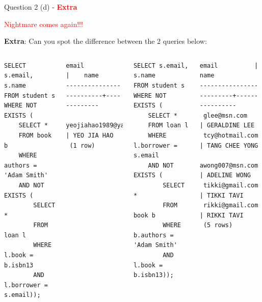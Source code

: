 \begin{frame}[fragile]{Question 2 (d) - \textcolor{red}{\textbf{Extra}}}

\begin{center}
	\textcolor{red}{Nightmare comes again!!!}
\end{center}

\textbf{Extra}: Can you spot the difference between the 2 queries below:
\begin{columns}[t]
\begin{lstlisting}[style=sql-small]
SELECT s.email, s.name
FROM student s
WHERE NOT EXISTS (
	SELECT * 
	FROM book b
	WHERE authors = 'Adam Smith' 
	AND NOT EXISTS (
		SELECT * 
		FROM loan l
		WHERE l.book = b.isbn13 
		AND l.borrower = s.email));
\end{lstlisting}
\begin{lstlisting}[style=terminal-tiny]	
          email          |    name
-------------------------+-------------
 yeojiahao1989@yahoo.com | YEO JIA HAO
 (1 row)	
\end{lstlisting}

\begin{lstlisting}[style=sql-small]
SELECT s.email, s.name
FROM student s
WHERE NOT EXISTS (
	SELECT * 
	FROM loan l
	WHERE l.borrower = s.email
	AND NOT EXISTS (
		SELECT *
		FROM book b
		WHERE b.authors = 'Adam Smith'
		AND l.book = b.isbn13));
\end{lstlisting}

\begin{lstlisting}[style=terminal-tiny]
          email          |      name
-------------------------+----------------
 glee@msn.com            | GERALDINE LEE
 tcy@hotmail.com         | TANG CHEE YONG
 awong007@msn.com        | ADELINE WONG
 tikki@gmail.com         | TIKKI TAVI
 rikki@gmail.com         | RIKKI TAVI
 (5 rows)
\end{lstlisting}
\end{columns}

\end{frame}

